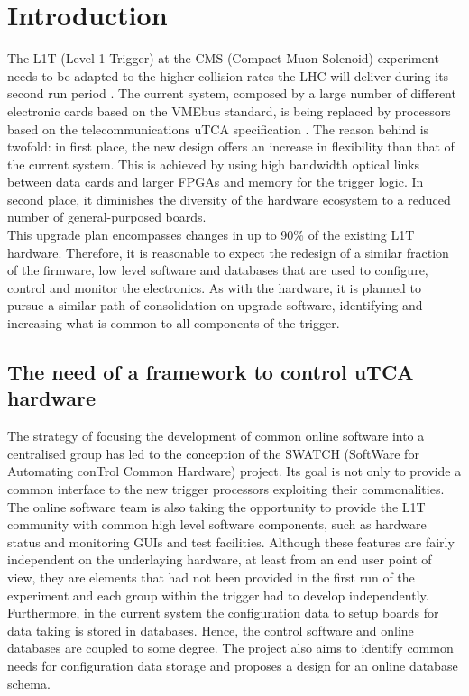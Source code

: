 \documentclass[a4paper]{jpconf}
\begin{document}
\section{Introduction}
The L1T (Level-1 Trigger) at the CMS (Compact Muon Solenoid) experiment needs to be adapted to the higher collision rates the LHC will deliver during its second run period \cite{cms_tdr}. The current system, composed by a large number of different electronic cards based on the VMEbus standard, is being replaced by processors based on the telecommunications uTCA specification \cite{utca_spec}. The reason behind is twofold: in first place, the new design offers an increase in flexibility than that of the current system. This is achieved by using high bandwidth optical links between data cards and larger FPGAs and memory for the trigger logic. In second place, it diminishes the diversity of the hardware ecosystem to a reduced number of general-purposed boards. \\
This upgrade plan encompasses changes in up to 90\% of the existing L1T hardware. Therefore, it is reasonable to expect the redesign of a similar fraction of the firmware, low level software and databases that are used to configure, control and monitor the electronics. As with the hardware, it is planned to pursue a similar path of consolidation on upgrade software, identifying and increasing what is common to all components of the trigger. 

\subsection{The need of a framework to control uTCA hardware}
The strategy of focusing the development of common online software into a centralised group has led to the conception of the SWATCH (SoftWare for Automating conTrol Common Hardware) project. Its goal is not only to provide a common interface to the new trigger processors exploiting their commonalities. The online software team is also taking the opportunity to provide the L1T community with common high level software components, such as hardware status and monitoring GUIs and test facilities. Although these features are fairly independent on the underlaying hardware, at least from an end user point of view, they are elements that had not been provided in the first run of the experiment and each group within the trigger had to develop independently. Furthermore, in the current system the configuration data to setup boards for data taking is stored in databases. Hence, the control software and online databases are coupled to some degree. The project also aims to identify common needs for configuration data storage and proposes a design for an online database schema. 
\end{document}
